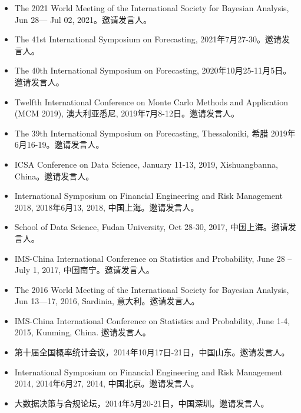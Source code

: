 \documentclass[twoside,a4paper,10pt]{amsart}
\begin{document}
\begin{itemize}

\item The 2021 World Meeting of the International Society for Bayesian Analysis, Jun
  28— Jul 02, 2021。邀请发言人。

\item The 41st International Symposium on Forecasting, 2021年7月27-30。邀请发言人。

\item The 40th International Symposium on Forecasting,  2020年10月25-11月5日。邀请发言人。

\item Twelfth International Conference on Monte Carlo Methods and Application (MCM 2019),
  澳大利亚悉尼, 2019年7月8-12日。邀请发言人。

\item The 39th International Symposium on Forecasting, Thessaloniki, 希腊 2019年6月16-19。邀请发言人。

\item ICSA Conference on Data Science, January 11-13, 2019, Xishuangbanna, China。邀请发言人。

\item International Symposium on Financial Engineering and Risk Management 2018, 2018年6月13,
  2018, 中国上海。邀请发言人。

\item School of Data Science, Fudan University, Oct 28-30, 2017, 中国上海。邀请发言人。

\item IMS-China International Conference on Statistics and Probability, June 28 – July 1,
  2017, 中国南宁。邀请发言人。


\item The 2016 World Meeting of the International Society for Bayesian Analysis, Jun
  13—17, 2016, Sardinia, 意大利。邀请发言人。

\item IMS-China International Conference on Statistics and Probability, June 1-4, 2015,
  Kunming, China. 邀请发言人。

\item 第十届全国概率统计会议，2014年10月17日-21日，中国山东。邀请发言人。

\item International Symposium on Financial Engineering and Risk Management 2014, 2014年6月27,
  2014, 中国北京。邀请发言人。

\item 大数据决策与合规论坛，2014年5月20-21日，中国深圳。邀请发言人。


\end{itemize}
\end{document}
